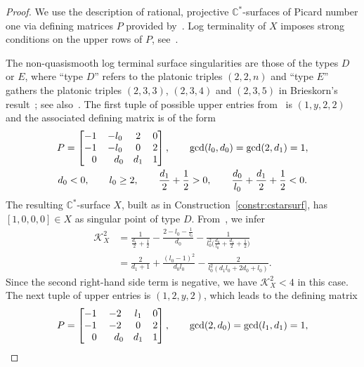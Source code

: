\documentclass[10pt,a4paper]{amsart}
\theoremstyle{definition}
\def\CC{{\mathbb C}}
\begin{document}
\begin{proof}
We use the description of rational, projective
$\CC^*$-surfaces of Picard number one via
defining matrices $P$ provided
by~\cite[Construction~4.2, Proposition~4.5]{HaHaHaSp}.
Log terminality of $X$ imposes strong
conditions on the upper rows of $P$,
see~\cite[Proposition~5.9]{HaHaHaSp}.

The non-quasismooth log terminal surface singularities
are those of the types $D$ or $E$, where ``type $D$''
refers to the platonic triples $(2,2,n)$ and ``type $E$''
gathers the platonic triples $(2,3,3)$, $(2,3,4)$
and $(2,3,5)$ in Brieskorn's result~\cite[Satz~2.10]{Br};
see also~\cite[Proposition~8.14]{HaHaSp}.
The first tuple of possible upper entries
from~\cite[Proposition~5.9]{HaHaHaSp} is
$(1,y,2,2)$ and the associated defining
matrix is of the form
\begin{gather*}
P
 =
\begin{bmatrix}
-1 & -l_0 & 2 & 0
\\
-1 & -l_0 & 0 & 2
\\
\hphantom{-} 0 & \hphantom{-}d_0 & d_1 & 1
\end{bmatrix},
\qquad
\gcd(l_0,d_0) = \gcd(2,d_1) = 1,
\\
d_0 < 0, \qquad
l_0 \ge 2, \qquad
\frac{d_1}{2}+\frac{1}{2} > 0, \qquad
\frac{d_0}{l_0}+\frac{d_1}{2}+\frac{1}{2} < 0.
\end{gather*}
The resulting $\CC^*$-surface $X$, built as in
Construction~\ref{constr:cstarsurf}, has
$[1,0,0,0] \in X$ as singular point
of type $D$.
From~\cite[Proposition~7.9]{HaHaSp}, we infer
\begin{align*}
\mathcal{K}_X^2
&{}=
\frac{1}{\frac{d_1}{2}+\frac{1}{2}}
 -
\frac{2-l_0-\frac{1}{l_0}}{d_0}
 -
\frac{1}{l_0^2\bigl(\frac{d_0}{l_0}+\frac{d_1}{2}+\frac{1}{2}\bigr)}
\\[10pt]
&{}=
\frac{2}{d_1+1}
 +
\frac{(l_0-1)^2}{d_0l_0}
 -
\frac{2}{l_0^2(d_1l_0 + 2d_0 + l_0)}.
\end{align*}
Since the second right-hand side term is negative,
we have $\mathcal{K}_X^2 < 4$ in this case.
The next tuple of upper entries is $(1,2,y,2)$,
which leads to the defining matrix
\begin{gather*}
P
 =
\begin{bmatrix}
-1 & -2 & l_1 & 0
\\
-1 & -2 & 0 & 2
\\
\hphantom{-} 0 & \hphantom{-}d_0 & d_1 & 1
\end{bmatrix},
\qquad
\gcd(2,d_0) = \gcd(l_1,d_1) = 1,
\\

\end{gather*}
\end{proof}
\end{document}
